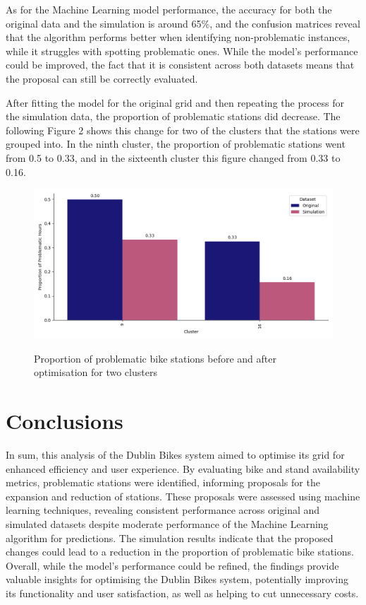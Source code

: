 \vspace{0.3cm}
\noindent As for the Machine Learning model performance, the accuracy for both the original data and the simulation is around 65\%, and the confusion matrices reveal that the algorithm performs better when identifying non-problematic instances, while it struggles with spotting problematic ones. While the model's performance could be improved, the fact that it is consistent across both datasets means that the proposal can still be correctly evaluated. 

\vspace{0.3cm}
\noindent After fitting the model for the original grid and then repeating the process for the simulation data, the proportion of problematic stations did decrease. The following Figure 2 shows this change for two of the clusters that the stations were grouped into. In the ninth cluster, the proportion of problematic stations went from 0.5 to 0.33, and in the sixteenth cluster this figure changed from 0.33 to 0.16. 

\begin{figure}[h]
    \centering
    \caption{Proportion of problematic bike stations before and after optimisation for two clusters}
    \includegraphics[width=\textwidth]{sections/res3.png}
    \label{fig:example}
\end{figure}

\vspace{-1cm}
\section{Conclusions}
\vspace{-0.5cm}

In sum, this analysis of the Dublin Bikes system aimed to optimise its grid for enhanced efficiency and user experience. By evaluating bike and stand availability metrics, problematic stations were identified, informing proposals for the expansion and reduction of stations. These proposals were assessed using machine learning techniques, revealing consistent performance across original and simulated datasets despite moderate performance of the Machine Learning algorithm for predictions. The simulation results indicate that the proposed changes could lead to a reduction in the proportion of problematic bike stations. Overall, while the model's performance could be refined, the findings provide valuable insights for optimising the Dublin Bikes system, potentially improving its functionality and user satisfaction, as well as helping to cut unnecessary costs. 